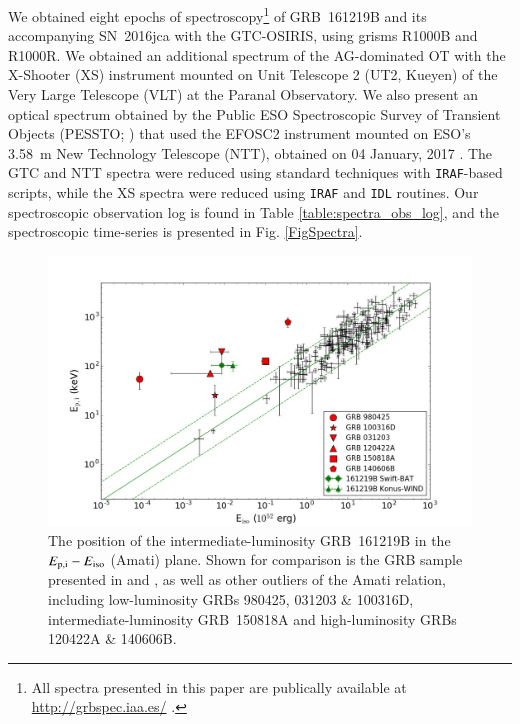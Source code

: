 \documentclass[traditabstract,longauth]{aa}
\begin{document}
We obtained eight epochs of spectroscopy\footnote{All spectra presented in this paper are publically available at \url{http://grbspec.iaa.es/} \citep{deUgartegrbspec}.} of GRB~161219B and its accompanying SN~2016jca with the GTC-OSIRIS, using grisms R1000B and R1000R.  We obtained an additional spectrum of the AG-dominated OT with the X-Shooter (XS) instrument \citep{Vernet2011} mounted on Unit Telescope 2 (UT2, Kueyen) of the Very Large Telescope (VLT) at the Paranal Observatory.  We also present an optical spectrum obtained by the Public ESO Spectroscopic Survey of Transient Objects (PESSTO; \citealt{Smartt15}) that used the EFOSC2 instrument mounted on ESO's 3.58~m New Technology Telescope (NTT), obtained on 04 January, 2017 \citep{Chen17}.  The GTC and NTT spectra were reduced using standard techniques with \texttt{IRAF}-based scripts, while the XS spectra were reduced using \texttt{IRAF} and \texttt{IDL} routines.  Our spectroscopic observation log is found in Table \ref{table:spectra_obs_log}, and the spectroscopic time-series is presented in Fig. \ref{FigSpectra}.  




\begin{figure}
   \centering%
   \includegraphics[width=\columnwidth, trim={0 0 0 0}]{Fig2_Amati_plot-eps-converted-to.pdf}
      \caption{The position of the intermediate-luminosity GRB~161219B in the $E_{\rm p,i}-E_{\rm iso}$ (Amati) plane.  Shown for comparison is the GRB sample presented in \citet{Amati02} and \citep{Cano15}, as well as other outliers of the Amati relation, including low-luminosity GRBs 980425, 031203 \& 100316D, intermediate-luminosity GRB~150818A and high-luminosity GRBs 120422A \& 140606B.}
    \label{FigAmati}
\end{figure}
\end{document}
